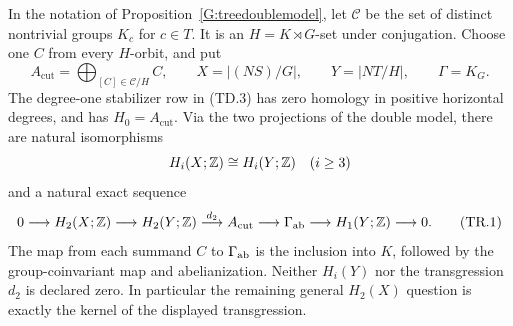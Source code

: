 \begin{corollary}
\label{G:stabilizerrow}
In the notation of Proposition~\ref{G:treedoublemodel}, let
$\mathscr C$ be the set of distinct nontrivial groups $K_c$
for $c\in T$. It is an $H=K\rtimes G$-set under conjugation.
Choose one $C$ from every $H$-orbit, and put
\[
 A_{\mathrm{cut}}=\bigoplus_{[C]\in\mathscr C/H}C,
 \qquad X=|(NS)/G|,\qquad Y=|NT/H|,\qquad\Gamma=K_G.
\]
The degree-one stabilizer row in (TD.3) has zero homology in
positive horizontal degrees, and has $H_0=A_{\mathrm{cut}}$.
Via the two projections of the double model, there are natural isomorphisms
\[
 H_i(X;\mathbb Z)\cong H_i(Y;\mathbb Z)\quad(i\ge3)
\]
and a natural exact sequence
\[
 0\longrightarrow H_2(X;\mathbb Z)\longrightarrow H_2(Y;\mathbb Z)
 \stackrel{d_2}{\longrightarrow} A_{\mathrm{cut}}
 \longrightarrow\Gamma_{\mathrm{ab}}
 \longrightarrow H_1(Y;\mathbb Z)\longrightarrow0.
 \tag{TR.1}
\]
The map from each summand $C$ to $\Gamma_{\mathrm{ab}}$ is the
inclusion into $K$, followed by the group-coinvariant map and
abelianization. Neither $H_i(Y)$ nor the transgression $d_2$
is declared zero. In particular the remaining general
$H_2(X)$ question is exactly the kernel of the displayed
transgression.
\end{corollary}
